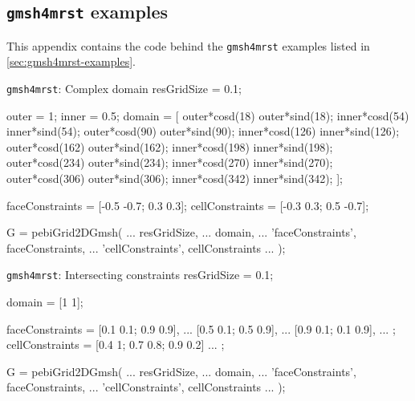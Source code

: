 \subsection{\texttt{gmsh4mrst} examples}
\label{app:gmsh4mrst-examples}
This appendix contains the code behind the \verb|gmsh4mrst| examples listed in \autoref{sec:gmsh4mrst-examples}.

\begin{matlab}[label=matlab:complex]{\texttt{gmsh4mrst}: Complex domain}
resGridSize = 0.1;

outer = 1;
inner = 0.5;
domain = [
    outer*cosd(18) outer*sind(18);
    inner*cosd(54) inner*sind(54);
    outer*cosd(90) outer*sind(90);
    inner*cosd(126) inner*sind(126);
    outer*cosd(162) outer*sind(162);
    inner*cosd(198) inner*sind(198);
    outer*cosd(234) outer*sind(234);
    inner*cosd(270) inner*sind(270);
    outer*cosd(306) outer*sind(306);
    inner*cosd(342) inner*sind(342);
];

faceConstraints = {[-0.5 -0.7; 0.3 0.3]};
cellConstraints = {[-0.3 0.3; 0.5 -0.7]};

G = pebiGrid2DGmsh( ...
    resGridSize, ...
    domain, ...
    'faceConstraints', faceConstraints, ...
    'cellConstraints', cellConstraints ...
);
\end{matlab}

\begin{matlab}[label=matlab:intersecting]{\texttt{gmsh4mrst}: Intersecting constraints}
resGridSize = 0.1;

domain = [1 1];

faceConstraints = {
    [0.1 0.1; 0.9 0.9], ...
    [0.5 0.1; 0.5 0.9], ...
    [0.9 0.1; 0.1 0.9], ...
};
cellConstraints = {
    [0.4 1; 0.7 0.8; 0.9 0.2] ...
};

G = pebiGrid2DGmsh( ...
    resGridSize, ...
    domain, ...
    'faceConstraints', faceConstraints, ...
    'cellConstraints', cellConstraints ...
);
\end{matlab}




